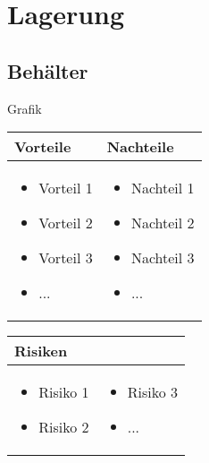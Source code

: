
\section{Lagerung}


\subsection{Behälter}

Grafik

\begin{table}[h]
\begin{tabular}{p{} | p{}}


 \textbf{Vorteile} & \textbf{Nachteile} \\ \hline
	 
\begin{itemize}
\item Vorteil 1
\item Vorteil 2
\item Vorteil 3
\item ...
\end{itemize}

 
 &
 
\begin{itemize}
\item Nachteil 1
\item Nachteil 2
\item Nachteil 3
\item ...
\end{itemize}

\end{tabular}
\end{table}

\begin{table}[h]
\begin{tabular}{p{}p{}}


 \textbf{Risiken} & \\ \hline
	 
\begin{itemize}
\item Risiko 1
\item Risiko 2
\end{itemize}
&
\begin{itemize}
\item Risiko 3
\item ...
\end{itemize}

 
\end{tabular}
\end{table}

\pagebreak
